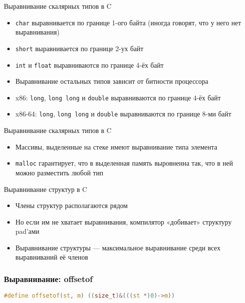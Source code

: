 \documentclass[10pt,pdf,hyperref={unicode}]{beamer}
\begin{document}
\begin{frame}{Выравнивание скалярных типов в C}
\begin{itemize}
    \item \lstinline{char} выравнивается по границе 1-ого байта (иногда говорят, что у него нет выравнивания)
    \item \lstinline{short} выравнивается по границе 2-ух байт
    \item \lstinline{int} и \lstinline{float} выравниваются по границе 4-ёх байт
    \item Выравнивание остальных типов зависит от битности процессора
    \item x86: \lstinline{long}, \lstinline{long long} и \lstinline{double} выравниваются по границе 4-ёх байт
    \item x86-64: \lstinline{long}, \lstinline{long long} и \lstinline{double} выравниваются по границе 8-ми байт
\end{itemize}
\end{frame}

\begin{frame}{Выравнивание скалярных типов в C}
\begin{itemize}
    \item Массивы, выделенные на стеке имеют выравнивание типа элемента
    \item \lstinline{malloc} гарантирует, что в выделенная память выровненна так, что в ней можно разместить любой тип
\end{itemize}
\end{frame}

\begin{frame}{Выравнивание структур в C}
\begin{itemize}
    \item Члены структур располагаются рядом
    \item Но если им не хватает выравнивания, компилятор «добивает» структуру pad'ами
    \item Выравнивание структуры — максимальное выравнивание среди всех выравниваний её членов
\end{itemize}
\end{frame}

\begin{frame}[fragile]
\frametitle{Выравнивание: offsetof}
\begin{lstlisting}[language=c]
#define offsetof(st, m) ((size_t)&(((st *)0)->m))
\end{lstlisting}
\end{frame}
\end{document}
